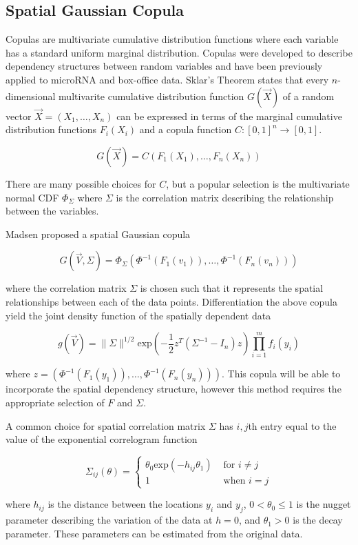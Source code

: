 \documentclass{article}
\begin{document}
\subsection{Spatial Gaussian Copula}
Copulas are multivariate cumulative distribution functions where each variable has a standard uniform marginal distribution.
Copulas were developed to describe dependency structures between random variables and have been previously applied to microRNA\cite{gaynanova18} and box-office data\cite{duan17}.
Sklar's Theorem states that every $n$-dimensional multivarite cumulative distribution function $G(\vec{X})$ of a random vector $\vec{X} = (X_1, \ldots ,X_n)$ can be expressed in terms of the marginal cumulative distribution functions $F_i(X_i)$ and a copula function $C: [0,1]^n \rightarrow [0,1]$.

$$
G(\vec{X}) = C(F_1(X_1), \ldots, F_n(X_n))
$$

There are many possible choices for $C$, but a popular selection is the multivariate normal CDF $\Phi_{\Sigma}$ where $\Sigma$ is the correlation matrix describing the relationship between the variables.

Madsen\cite{madsen09} proposed a spatial Gaussian copula

$$
G(\vec{V}, \Sigma) = \Phi_{\Sigma}(\Phi^{-1}(F_1(v_1)), \ldots, \Phi^{-1}(F_n(v_n)))
$$

where the correlation matrix $\Sigma$ is chosen such that it represents the spatial relationships between each of the data points.
Differentiation the above copula yield the joint density function of the spatially dependent data

$$
g(\vec{V}) = \| \Sigma \|^{1/2} \text{exp}\left(-\frac{1}{2} z^T (\Sigma^{-1} - I_n) z\right) \prod_{i = 1}^m f_i(y_i)
$$

where $z = (\Phi^{-1}(F_1(y_1)), \ldots, \Phi^{-1}(F_n(y_n)))$.
This copula will be able to incorporate the spatial dependency structure, however this method requires the appropriate selection of $F$ and $\Sigma$.

A common choice for spatial correlation matrix $\Sigma$ has $i,j$th entry equal to the value of the exponential correlogram function

$$
\Sigma_{ij}(\theta) = 
	\begin{cases}
		\theta_0 \text{exp}(-h_{ij} \theta_1) & \text{ for } i \neq j\\
		1 & \text{ when } i = j
	\end{cases}
$$

where $h_{ij}$ is the distance between the locations $y_i$ and $y_j$, $0 < \theta_0 \leq 1$ is the nugget parameter describing the variation of the data at $h = 0$, and $\theta_1 > 0$ is the decay parameter.
These parameters can be estimated from the original data.
\end{document}
